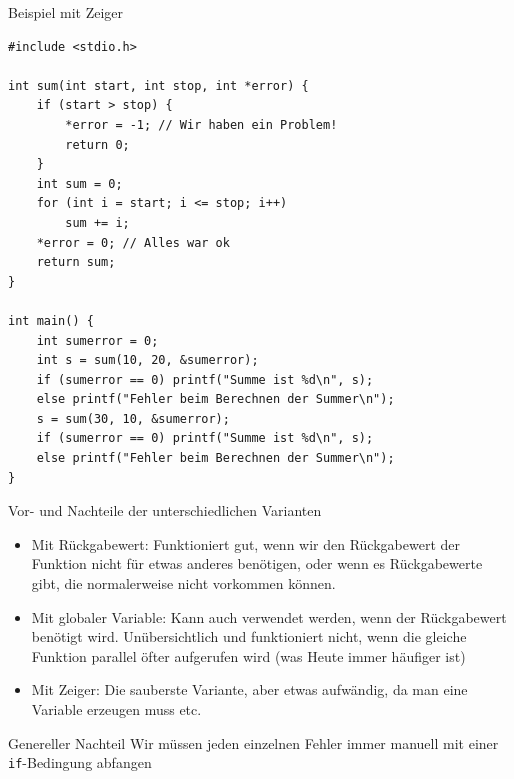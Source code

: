 \documentclass[presentation]{beamer}
\begin{document}
\begin{frame}[label={sec:orgceab1e5},fragile]{Beispiel mit Zeiger}
 \begin{verbatim}
#include <stdio.h>

int sum(int start, int stop, int *error) {
    if (start > stop) {
        *error = -1; // Wir haben ein Problem!
        return 0;
    }
    int sum = 0;
    for (int i = start; i <= stop; i++)
        sum += i;
    *error = 0; // Alles war ok
    return sum;
}

int main() {
    int sumerror = 0;
    int s = sum(10, 20, &sumerror);
    if (sumerror == 0) printf("Summe ist %d\n", s);
    else printf("Fehler beim Berechnen der Summer\n");
    s = sum(30, 10, &sumerror);
    if (sumerror == 0) printf("Summe ist %d\n", s);
    else printf("Fehler beim Berechnen der Summer\n");
}
\end{verbatim}
\end{frame}
\begin{frame}[label={sec:orgd3a68f2},fragile]{Vor- und Nachteile der unterschiedlichen Varianten}
 \begin{itemize}
\item \alert{Mit Rückgabewert:} Funktioniert gut, wenn wir den Rückgabewert der
Funktion nicht für etwas anderes benötigen, oder wenn es
Rückgabewerte gibt, die normalerweise nicht vorkommen können.
\item \alert{Mit globaler Variable:} Kann auch verwendet werden, wenn der
Rückgabewert benötigt wird. Unübersichtlich und funktioniert nicht,
wenn die gleiche Funktion parallel öfter aufgerufen wird (was Heute
immer häufiger ist)
\item \alert{Mit Zeiger:} Die sauberste Variante, aber etwas aufwändig, da man
eine Variable erzeugen muss etc.
\end{itemize}
\begin{block}{Genereller Nachteil}
Wir müssen jeden einzelnen Fehler immer manuell mit einer
{\color{solarizedYellow}\texttt{if}}-Bedingung abfangen
\end{block}
\end{frame}
\end{document}

